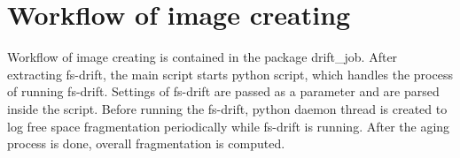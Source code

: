 \documentclass[
  color, %
  table, %
  lof,   %
  lot,   %
]{fithesis3}
\begin{document}





\section{Workflow of image creating}
Workflow of image creating is contained in the package drift\_job. After extracting fs-drift, the main script starts python script, which handles the process of running fs-drift. Settings of fs-drift are passed as a parameter and are parsed inside the script. Before running the fs-drift, python daemon thread is created to log free space fragmentation periodically while fs-drift is running. After the aging process is done, overall fragmentation is computed.
\end{document}
